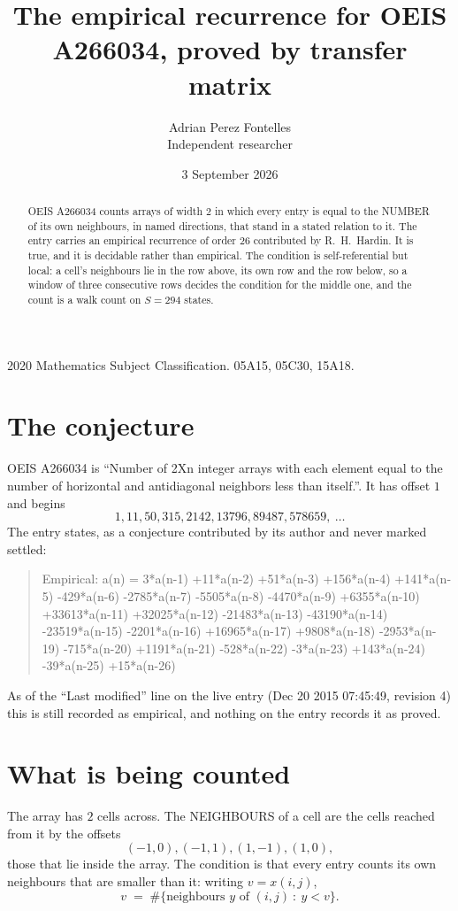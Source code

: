 \documentclass[11pt,a4paper]{article}
\title{The empirical recurrence for OEIS A266034, proved by transfer matrix}
\author{Adrian Perez Fontelles\\ \small Independent researcher}
\date{3 September 2026}
\theoremstyle{plain}
\theoremstyle{definition}
\begin{document}
\maketitle

\begin{abstract}
OEIS A266034 counts arrays of width $2$ in which every entry is equal to the NUMBER of its own
neighbours, in named directions, that stand in a stated relation to it. The entry carries an
empirical recurrence of order $26$ contributed by R.~H.~Hardin. It is true, and it is
decidable rather than empirical. The condition is self-referential but local: a cell's
neighbours lie in the row above, its own row and the row below, so a window of three
consecutive rows decides the condition for the middle one, and the count is a walk count on
$S=294$ states.
\end{abstract}

\noindent\small 2020 Mathematics Subject Classification. 05A15, 05C30, 15A18.\normalsize

\section{The conjecture}

OEIS A266034 is ``Number of 2Xn integer arrays with each element equal to the number of horizontal and antidiagonal neighbors less than itself.''. It has offset $1$ and begins
\[
1, 11, 50, 315, 2142, 13796, 89487, 578659,\ \dots
\]
The entry states, as a conjecture contributed by its author and never marked settled:
\begin{quote}
Empirical: a(n) = 3*a(n-1) +11*a(n-2) +51*a(n-3) +156*a(n-4) +141*a(n-5) -429*a(n-6) -2785*a(n-7) -5505*a(n-8) -4470*a(n-9) +6355*a(n-10) +33613*a(n-11) +32025*a(n-12) -21483*a(n-13) -43190*a(n-14) -23519*a(n-15) -2201*a(n-16) +16965*a(n-17) +9808*a(n-18) -2953*a(n-19) -715*a(n-20) +1191*a(n-21) -528*a(n-22) -3*a(n-23) +143*a(n-24) -39*a(n-25) +15*a(n-26)
\end{quote}
As of the ``Last modified'' line on the live entry (Dec 20 2015 07:45:49, revision 4) this is still
recorded as empirical, and nothing on the entry records it as proved.

\section{What is being counted}

The array has $2$ cells across. The NEIGHBOURS of a cell are the cells reached from it by the
offsets
\[
(-1,0), (-1,1), (1,-1), (1,0),
\]
those that lie inside the array. The condition is that every entry counts its own neighbours
that are smaller than it: writing $v=x(i,j)$,
\[
v\;=\;\#\{\text{neighbours } y \text{ of } (i,j)\ :\ y<v\} .
\]
\end{document}
